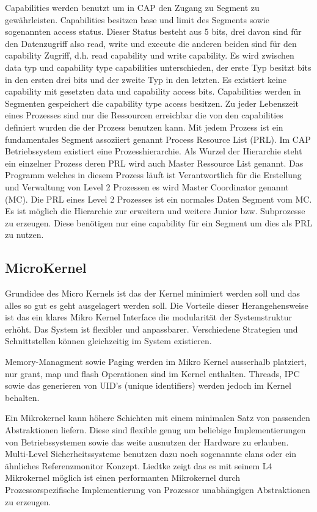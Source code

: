 \documentclass[9pt,technote]{IEEEtran}
\begin{document}
     
     Capabilities werden benutzt um in CAP den Zugang zu Segment zu gew\"ahrleisten. Capabilities besitzen base und limit des Segments sowie sogenannten access status. Dieser Status
     besteht aus 5 bits, drei davon sind f\"ur den Datenzugriff also read, write und execute die anderen beiden sind f\"ur den capability Zugriff,
     d.h. read capability und write capability. Es wird zwischen data typ und capability type capabilities unterschieden, der erste Typ besitzt bits in den ersten drei bits und
     der zweite Typ in den letzten. Es existiert keine capability mit gesetzten data und capability access bits. Capabilities werden in Segmenten gespeichert die
     capability type access besitzen. Zu jeder Lebenszeit eines Prozesses sind nur die Ressourcen erreichbar die von den capabilities definiert wurden die der Prozess
     benutzen kann. Mit jedem Prozess ist ein fundamentales Segment assoziiert genannt Process Resource List (PRL). 
     Im CAP Betriebssystem existiert eine Prozesshierarchie. Als Wurzel der Hierarchie steht ein einzelner Prozess deren PRL wird auch Master Ressource List genannt.    
     Das Programm welches in diesem Prozess l\"auft ist Verantwortlich f\"ur die Erstellung und Verwaltung von Level 2 Prozessen es wird Master Coordinator genannt (MC).
     Die PRL eines Level 2 Prozesses ist ein normales Daten Segment vom MC. Es ist m\"oglich die Hierarchie zur erweitern und weitere Junior bzw. Subprozesse zu erzeugen.
     Diese ben\"otigen nur eine capability f\"ur ein Segment um dies als PRL zu nutzen.
  \subsection{MicroKernel}
    Grundidee des Micro Kernels ist das der Kernel minimiert werden soll und das alles so gut es geht ausgelagert werden soll.
    Die Vorteile dieser Herangehensweise ist das ein klares Mikro Kernel Interface die modularit\"at der Systemstruktur erh\"oht.
    Das System ist flexibler und anpassbarer. Verschiedene Strategien und Schnittstellen k\"onnen gleichzeitig im System existieren.
    
    Memory-Managment sowie Paging werden im Mikro Kernel ausserhalb platziert, nur grant, map und flash Operationen sind im Kernel enthalten. \cite[S. 238 f]{inproc:micro}
    Threads, IPC sowie das generieren von UID's (unique identifiers) werden jedoch im Kernel behalten.
    
    Ein Mikrokernel kann h\"ohere Schichten mit einem minimalen Satz von passenden Abstraktionen liefern.
    Diese sind flexible genug um beliebige Implementierungen von Betriebssystemen sowie das weite ausnutzen der Hardware zu erlauben.
    Multi-Level Sicherheitssysteme benutzen dazu noch sogenannte clans oder ein \"ahnliches Referenzmonitor Konzept.        
    Liedtke zeigt das es mit seinem L4 Mikrokernel m\"oglich ist einen performanten Mikrokernel durch Prozessorspezifische Implementierung 
    von Prozessor unabh\"angigen Abstraktionen zu erzeugen.\cite[S. 248]{inproc:micro}
  
\end{document}
